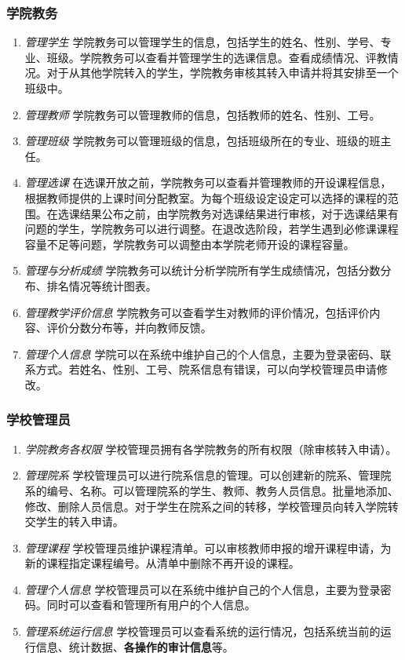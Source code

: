 \subsubsection{学院教务}
\begin{enumerate}
    \item \textit{管理学生} \quad 学院教务可以管理学生的信息，包括学生的姓名、性别、学号、专业、班级。学院教务可以查看并管理学生的选课信息。查看成绩情况、评教情况。对于从其他学院转入的学生，学院教务审核其转入申请并将其安排至一个班级中。
    \item \textit{管理教师} \quad 学院教务可以管理教师的信息，包括教师的姓名、性别、工号。
    \item \textit{管理班级} \quad 学院教务可以管理班级的信息，包括班级所在的专业、班级的班主任。
    \item \textit{管理选课} \quad 在选课开放之前，学院教务可以查看并管理教师的开设课程信息，根据教师提供的上课时间分配教室。为每个班级设定设定可以选择的课程的范围。在选课结果公布之前，由学院教务对选课结果进行审核，对于选课结果有问题的学生，学院教务可以进行调整。在退改选阶段，若学生遇到必修课课程容量不足等问题，学院教务可以调整由本学院老师开设的课程容量。
    \item \textit{管理与分析成绩} \quad 学院教务可以统计分析学院所有学生成绩情况，包括分数分布、排名情况等统计图表。
    \item \textit{管理教学评价信息} \quad 学院教务可以查看学生对教师的评价情况，包括评价内容、评价分数分布等，并向教师反馈。
    \item \textit{管理个人信息} \quad 学院可以在系统中维护自己的个人信息，主要为登录密码、联系方式。若姓名、性别、工号、院系信息有错误，可以向学校管理员申请修改。
\end{enumerate}

\subsubsection{学校管理员}
\begin{enumerate}
    \item \textit{学院教务各权限} \quad 学校管理员拥有各学院教务的所有权限（除审核转入申请）。
    \item \textit{管理院系} \quad 学校管理员可以进行院系信息的管理。可以创建新的院系、管理院系的编号、名称。可以管理院系的学生、教师、教务人员信息。批量地添加、修改、删除人员信息。对于学生在院系之间的转移，学校管理员向转入学院转交学生的转入申请。
    \item \textit{管理课程} \quad 学校管理员维护课程清单。可以审核教师申报的增开课程申请，为新的课程指定课程编号。从清单中删除不再开设的课程。
    \item \textit{管理个人信息} \quad 学校管理员可以在系统中维护自己的个人信息，主要为登录密码。同时可以查看和管理所有用户的个人信息。
    \item \textit{管理系统运行信息} \quad 学校管理员可以查看系统的运行情况，包括系统当前的运行信息、统计数据、\textbf{各操作的审计信息}等。
\end{enumerate}
